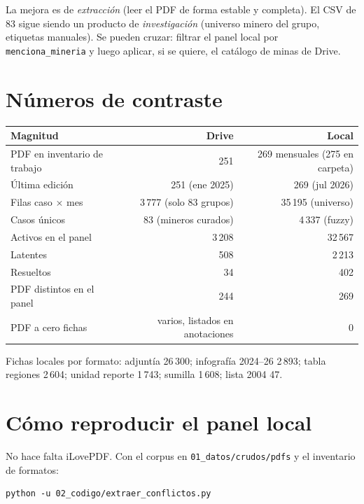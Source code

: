 \documentclass[11pt,a4paper]{article}
\begin{document}
La mejora es de \emph{extracción} (leer el PDF de forma estable y completa). El CSV de 83 sigue siendo un producto de \emph{investigación} (universo minero del grupo, etiquetas manuales). Se pueden cruzar: filtrar el panel local por \texttt{menciona\_mineria} y luego aplicar, si se quiere, el catálogo de minas de Drive.

\section{Números de contraste}

\begin{center}
\renewcommand{\arraystretch}{1.2}
\begin{tabular}{@{}lrr@{}}
\toprule
\textbf{Magnitud} & \textbf{Drive} & \textbf{Local} \\
\midrule
PDF en inventario de trabajo & 251 & 269 mensuales (275 en carpeta) \\
Última edición & 251 (ene 2025) & 269 (jul 2026) \\
Filas caso $\times$ mes & 3\,777 (solo 83 grupos) & 35\,195 (universo) \\
Casos únicos & 83 (mineros curados) & 4\,337 (fuzzy) \\
Activos en el panel & 3\,208 & 32\,567 \\
Latentes & 508 & 2\,213 \\
Resueltos & 34 & 402 \\
PDF distintos en el panel & 244 & 269 \\
PDF a cero fichas & varios, listados en anotaciones & 0 \\
\bottomrule
\end{tabular}
\end{center}

Fichas locales por formato: adjuntía 26\,300; infografía 2024--26 2\,893; tabla regiones 2\,604; unidad reporte 1\,743; sumilla 1\,608; lista 2004 47.

\section{Cómo reproducir el panel local}

No hace falta iLovePDF. Con el corpus en \texttt{01\_datos/crudos/pdfs} y el inventario de formatos:

\begin{verbatim}
python -u 02_codigo/extraer_conflictos.py
\end{verbatim}
\end{document}
